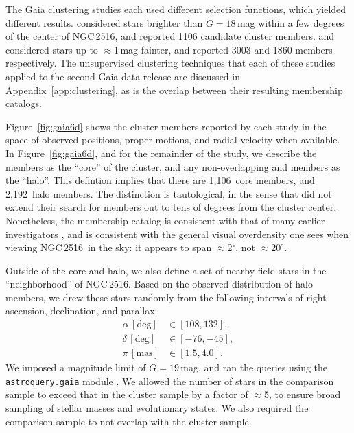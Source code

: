 \documentclass[12pt,twocolumn,tighten]{aastex63}
\newcommand{\cn}{NGC\,2516} %
\newcommand{\ncore}{1{,}106}  %
\newcommand{\nhalo}{2{,}192} %
\begin{document}
The Gaia clustering studies each used different selection functions,
which yielded different results.  
considered stars brighter than $G=18$\,mag within a few degrees of the
center of \cn, and reported 1106 candidate cluster members.
 and 
considered stars up to $\approx$1\,mag fainter, and reported 3003 and
1860 members respectively.  The unsupervised clustering techniques
that each of these studies applied to the second Gaia data release are
discussed in Appendix~\ref{app:clustering}, as is the overlap between
their resulting membership catalogs.

Figure~\ref{fig:gaia6d} shows the cluster members reported by each
study in the space of observed positions, proper motions, and radial
velocity when available.
In Figure~\ref{fig:gaia6d}, and for the remainder of the study, we
describe the  members as the
``core'' of the cluster, and any non-overlapping
 and 
members as the ``halo''.  This defintion implies that there are
\ncore\ core members, and \nhalo\ halo members.  The distinction is
tautological, in the sense that  did
not extend their search for members out to tens of degrees from the
cluster center.  Nonetheless, the 
membership catalog is consistent with that of many earlier
investigators \citep[{\it
e.g.},][]{jeffries_ngc2516_2001,Kharchenko_et_al_2013}, and is
consistent with the general visual overdensity one sees when viewing
\cn\ in the sky: it appears to span $\approx$2$^\circ$, not
$\approx20^\circ$.

Outside of the core and halo, we also define a set of nearby field
stars in the ``neighborhood'' of \cn.  Based on the observed
distribution of halo members, we drew these stars randomly from the
following intervals of right ascension, declination, and parallax:
\begin{align}
  \alpha\,[\mathrm{deg}] &\in [108, 132], \\
  \delta\,[\mathrm{deg}] &\in [-76, -45], \\
  \pi\,[\mathrm{mas}] &\in [1.5, 4.0].
\end{align}
We imposed a magnitude limit of $G=19$\,mag, and ran the queries using
the \texttt{astroquery.gaia} module \citep{astroquery_2018}.  We
allowed the number of stars in the comparison sample to exceed that in
the cluster sample by a factor of $\approx$5, to ensure broad sampling
of stellar masses and evolutionary states.  We also required the
comparison sample to not overlap with the cluster sample.
\end{document}
